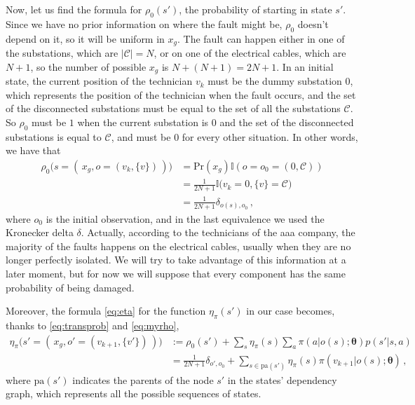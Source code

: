 Now, let us find the formula for $\rho_0(s')$, the probability of starting in state $s'$. Since we have no prior information on where the fault might be, $\rho_0$ doesn't depend on it, so it will be uniform in $x_g$. The fault can happen either in one of the substations, which are $|\mathcal C| = N$, or on one of the electrical cables, which are $N+1$, so the number of possible $x_g$ is $N + (N+1) = 2N+1$. In an initial state, the current position of the technician $v_k$ must be the dummy substation $0$, which represents the position of the technician when the fault occurs, and the set of the disconnected substations must be equal to the set of all the substations $\mathcal C$. So $\rho_0$ must be $1$ when the current substation is $0$ and the set of the disconnected substations is equal to $\mathcal C$, and must be $0$ for every other situation. In other words, we have that
\begin{equation}
    \begin{aligned}
        \rho_0 \Big(s = ( \, x_g, o =(v_k, \{v\}) \,) \Big)
        &= \text{Pr}(x_g) \mathbb I (o = o_0 = (0, \mathcal C)) \\
        &= \frac1{2N+1} \mathbb I \big( v_k = 0, \{v\} = \mathcal C \big) \\
        &= \frac1{2N+1} \delta_{o(s), o_0} \, ,
    \end{aligned}
    \label{eq:myrho}
\end{equation}
where $o_0$ is the initial observation, and in the last equivalence we used the Kronecker delta $\delta$. Actually, according to the technicians of the \acrshort{aaa} company, the majority of the faults happens on the electrical cables, usually when they are no longer perfectly isolated. We will try to take advantage of this information at a later moment, but for now we will suppose that every component has the same probability of being damaged.

Moreover, the formula \eqref{eq:eta} for the function $\eta_\pi(s')$ in our case becomes, thanks to \eqref{eq:transprob} and \eqref{eq:myrho},
\begin{equation}
    \begin{aligned}
        \eta_\pi\Big(s' = (\, x_g, o'=(v_{k+1}, \{v'\}) \,) \Big)
        &:= \rho_0(s') + \sum_s \eta_\pi(s) \sum_a \pi(a | o(s); \boldsymbol \theta) p(s' | s, a) \\
        &= \frac1{2N+1} \delta_{o', o_0} + \sum_{s \in \mathrm{pa}(s')} \eta_\pi(s) \pi(v_{k+1} | o(s); \boldsymbol \theta) \, ,
    \end{aligned}
    \label{eq:myeta}
\end{equation}
where $\mathrm{pa}(s')$ indicates the parents of the node $s'$ in the states' dependency graph, which represents all the possible sequences of states.

